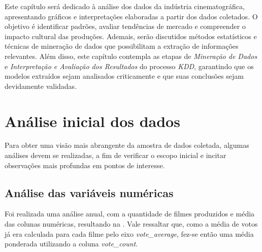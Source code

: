 \setcounter{secnumdepth}{3}

Este capítulo será dedicado à análise dos dados da indústria cinematográfica, apresentando gráficos e interpretações elaboradas a partir dos dados coletados. O objetivo é identificar padrões, avaliar tendências de mercado e compreender o impacto cultural das produções. Ademais, serão discutidos métodos estatísticos e técnicas de mineração de dados que possibilitam a extração de informações relevantes. Além disso, este capítulo contempla as etapas de \textit{Mineração de Dados} e \textit{Interpretação e Avaliação dos Resultados} do processo \textit{\acrshort{KDD}}, garantindo que os modelos extraídos sejam analisados criticamente e que suas conclusões sejam devidamente validadas.


\section{Análise inicial dos dados}
Para obter uma visão mais abrangente da amostra de dados coletada, algumas análises devem se realizadas, a fim de verificar o escopo inicial e incitar observações mais profundas em pontos de interesse.

\subsection{Análise das variáveis numéricas} \label{var-numericas}

Foi realizada uma análise anual, com a quantidade de filmes produzidos e média das colunas numéricas, resultando na . Vale ressaltar que, como a média de votos já era calculada para cada filme pelo eixo \textit{vote\_average}, fez-se então uma média ponderada utilizando a coluna \textit{vote\_count}.


